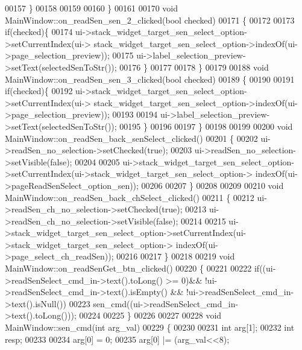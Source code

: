 \begin{DoxyCode}
00157     \}
00158 
00159 
00160 \}
00161 
00170 \textcolor{keywordtype}{void} MainWindow::on\_readSen\_sen\_2\_clicked(\textcolor{keywordtype}{bool} checked)
00171 \{
00172 
00173     \textcolor{keywordflow}{if}(checked)\{
00174          ui->stack\_widget\_target\_sen\_select\_option->setCurrentIndex(ui->
      stack\_widget\_target\_sen\_select\_option->indexOf(ui->page\_selection\_preview));
00175      ui->label\_selection\_preview->setText(selectedSenToStr());
00176     \}
00177 
00178 \}
00179 
00188 \textcolor{keywordtype}{void} MainWindow::on\_readSen\_sen\_3\_clicked(\textcolor{keywordtype}{bool} checked)
00189 \{
00190 
00191     \textcolor{keywordflow}{if}(checked)\{
00192          ui->stack\_widget\_target\_sen\_select\_option->setCurrentIndex(ui->
      stack\_widget\_target\_sen\_select\_option->indexOf(ui->page\_selection\_preview));
00193 
00194          ui->label\_selection\_preview->setText(selectedSenToStr());
00195      \}
00196 
00197 \}
00198 
00199 
00200 \textcolor{keywordtype}{void} MainWindow::on\_readSen\_back\_senSelect\_clicked()
00201 \{
00202     ui->readSen\_no\_selection->setChecked(\textcolor{keyword}{true});
00203     ui->readSen\_no\_selection->setVisible(\textcolor{keyword}{false});
00204 
00205   ui->stack\_widget\_target\_sen\_select\_option->setCurrentIndex(ui->stack\_widget\_target\_sen\_select\_option->
      indexOf(ui->pageReadSenSelect\_option\_sen));
00206 
00207 \}
00208 
00209 
00210 \textcolor{keywordtype}{void} MainWindow::on\_readSen\_back\_chSelect\_clicked()
00211 \{
00212     ui->readSen\_ch\_no\_selection->setChecked(\textcolor{keyword}{true});
00213     ui->readSen\_ch\_no\_selection->setVisible(\textcolor{keyword}{false});
00214 
00215     ui->stack\_widget\_target\_sen\_select\_option->setCurrentIndex(ui->stack\_widget\_target\_sen\_select\_option->
      indexOf(ui->page\_select\_ch\_readSen));
00216 
00217 \}
00218 
00219 \textcolor{keywordtype}{void} MainWindow::on\_readSenGet\_btn\_clicked()
00220 \{
00221 
00222        \textcolor{keywordflow}{if}((ui->readSenSelect\_cmd\_in->text().toLong() >= 0)&& !ui->readSenSelect\_cmd\_in->text().isEmpty() &&
        !ui->readSenSelect\_cmd\_in->text().isNull())
00223            sen\_cmd((ui->readSenSelect\_cmd\_in->text().toLong()));
00224 
00225 \}
00226 
00227 
00228 \textcolor{keywordtype}{void} MainWindow::sen\_cmd(\textcolor{keywordtype}{int} arg\_val)
00229 \{
00230 
00231                 \textcolor{keywordtype}{int} arg[1];
00232                  \textcolor{keywordtype}{int} resp;
00233 
00234                 arg[0] = 0;            
00235                 arg[0] |= (arg\_val<<8);

\end{DoxyCode}
